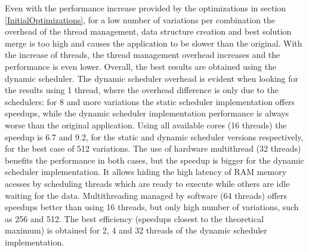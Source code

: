 Even with the performance increase provided by the optimizations in section \ref{InitialOptimizations}, for a low number of variations per combination the overhead of the thread management, data structure creation and best solution merge is too high and causes the application to be slower than the original. With the increase of threads, the thread management overhead increases and the performance is even lower. Overall, the best results are obtained using the dynamic scheduler. The dynamic scheduler overhead is evident when looking for the results using 1 thread, where the overhead difference is only due to the schedulers: for 8 and more variations the static scheduler implementation offers speedups, while the dynamic scheduler implementation performance is always worse than the original application. Using all available cores (16 threads) the speedup is 6.7 and 9.2, for the static and dynamic scheduler versions respectively, for the best case of 512 variations. The use of hardware multithread (32 threads) benefits the performance in both cases, but the speedup is bigger for the dynamic scheduler implementation. It allows hiding the high latency of RAM memory acesses by scheduling threads which are ready to execute while others are idle waiting for the data. Multithreading managed by software (64 threads) offers speedups better than using 16 threads, but only high number of variations, such as 256 and 512. The best efficiency (speedups closest to the theoretical maximum) is obtained for 2, 4 and 32 threads of the dynamic scheduler implementation.

